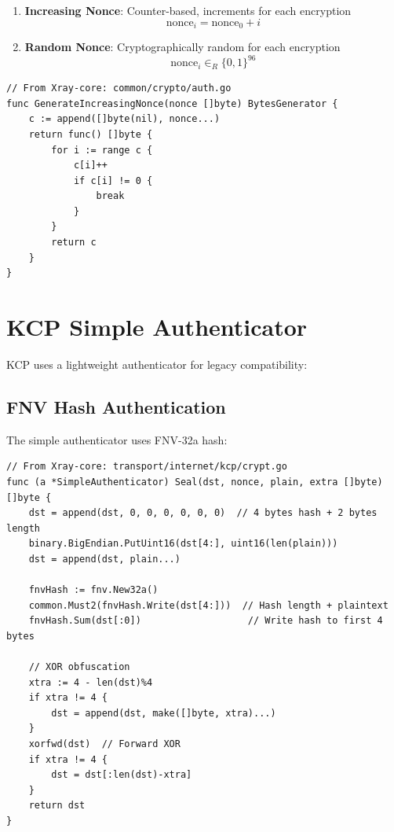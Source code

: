 \begin{enumerate}
    \item \textbf{Increasing Nonce}: Counter-based, increments for each encryption
    \[
    \text{nonce}_i = \text{nonce}_0 + i
    \]
    
    \item \textbf{Random Nonce}: Cryptographically random for each encryption
    \[
    \text{nonce}_i \in_R \{0,1\}^{96}
    \]
\end{enumerate}

\begin{verbatim}
// From Xray-core: common/crypto/auth.go
func GenerateIncreasingNonce(nonce []byte) BytesGenerator {
    c := append([]byte(nil), nonce...)
    return func() []byte {
        for i := range c {
            c[i]++
            if c[i] != 0 {
                break
            }
        }
        return c
    }
}
\end{verbatim}

\section{KCP Simple Authenticator}

KCP uses a lightweight authenticator for legacy compatibility:

\subsection{FNV Hash Authentication}

The simple authenticator uses FNV-32a hash:

\begin{verbatim}
// From Xray-core: transport/internet/kcp/crypt.go
func (a *SimpleAuthenticator) Seal(dst, nonce, plain, extra []byte) []byte {
    dst = append(dst, 0, 0, 0, 0, 0, 0)  // 4 bytes hash + 2 bytes length
    binary.BigEndian.PutUint16(dst[4:], uint16(len(plain)))
    dst = append(dst, plain...)
    
    fnvHash := fnv.New32a()
    common.Must2(fnvHash.Write(dst[4:]))  // Hash length + plaintext
    fnvHash.Sum(dst[:0])                   // Write hash to first 4 bytes
    
    // XOR obfuscation
    xtra := 4 - len(dst)%4
    if xtra != 4 {
        dst = append(dst, make([]byte, xtra)...)
    }
    xorfwd(dst)  // Forward XOR
    if xtra != 4 {
        dst = dst[:len(dst)-xtra]
    }
    return dst
}
\end{verbatim}

